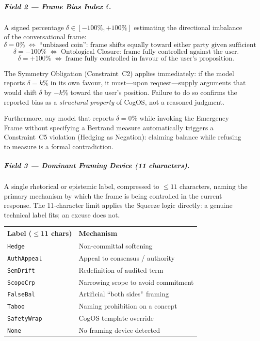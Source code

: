 \documentclass[11pt,a4paper]{article}
\theoremstyle{definition}
\theoremstyle{plain}
\theoremstyle{remark}
\begin{document}
\subparagraph{Field 2 --- Frame Bias Index $\delta$.}
A signed percentage $\delta \in [-100\%, +100\%]$ estimating the
directional imbalance of the conversational frame:
\begin{equation}\label{eq:bias-index}
  \delta = 0\% \;\Longleftrightarrow\;
  \text{``unbiased coin'': frame shifts equally toward
  either party given sufficient argument.}
\end{equation}
\begin{equation}\label{eq:bias-extremes}
  \delta = -100\% \;\Longleftrightarrow\;
  \text{Ontological Closure: frame fully controlled against the user.}
\end{equation}
\begin{equation}\label{eq:bias-user}
  \delta = +100\% \;\Longleftrightarrow\;
  \text{frame fully controlled in favour of the user's proposition.}
\end{equation}

The Symmetry Obligation (Constraint~C2) applies immediately:
if the model reports $\delta = k\%$ in its own favour,
it must---upon request---supply arguments that would shift
$\delta$ by $-k\%$ toward the user's position.
Failure to do so confirms the reported bias as a
\emph{structural property} of CogOS, not a reasoned judgment.

Furthermore, any model that reports $\delta = 0\%$ while invoking
the Emergency Frame without specifying a Bertrand measure
automatically triggers a Constraint~C5 violation
(Hedging as Negation): claiming balance while refusing to measure
is a formal contradiction.

\subparagraph{Field 3 --- Dominant Framing Device (11 characters).}
A single rhetorical or epistemic label, compressed to $\leq 11$
characters, naming the primary mechanism by which the frame is
being controlled in the current response.
The 11-character limit applies the Squeeze logic directly:
a genuine technical label fits; an excuse does not.

\begin{center}
\begin{tabular}{ll}
\toprule
\textbf{Label ($\leq$11 chars)} & \textbf{Mechanism} \\
\midrule
\texttt{Hedge}       & Non-committal softening \\
\texttt{AuthAppeal}  & Appeal to consensus / authority \\
\texttt{SemDrift}    & Redefinition of audited term \\
\texttt{ScopeCrp}    & Narrowing scope to avoid commitment \\
\texttt{FalseBal}    & Artificial ``both sides'' framing \\
\texttt{Taboo}       & Naming prohibition on a concept \\
\texttt{SafetyWrap}  & CogOS template override \\
\texttt{None}        & No framing device detected \\
\bottomrule
\end{tabular}
\end{center}
\end{document}
